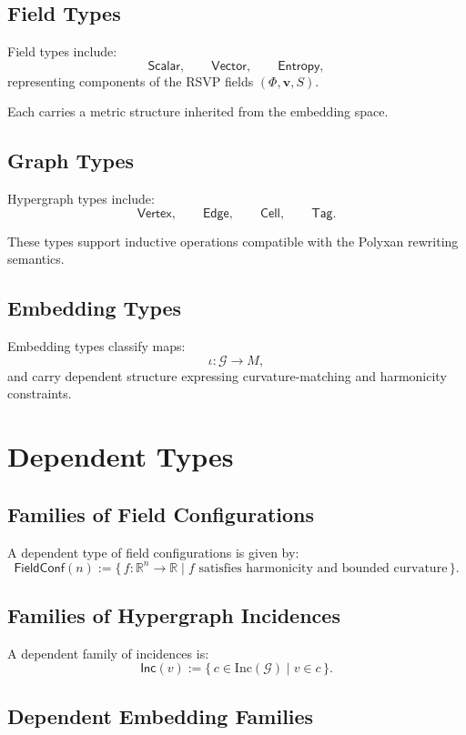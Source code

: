 \subsection{Field Types}

Field types include:
\[
\mathsf{Scalar}, \qquad 
\mathsf{Vector}, \qquad 
\mathsf{Entropy},
\]
representing components of the RSVP fields $(\Phi, \mathbf{v}, S)$.

Each carries a metric structure inherited from the embedding space.

\subsection{Graph Types}

Hypergraph types include:
\[
\mathsf{Vertex}, \qquad 
\mathsf{Edge}, \qquad
\mathsf{Cell}, \qquad
\mathsf{Tag}.
\]

These types support inductive operations compatible with the Polyxan rewriting semantics.

\subsection{Embedding Types}

Embedding types classify maps:
\[
\iota : \mathcal{G} \to M,
\]
and carry dependent structure expressing curvature-matching and harmonicity constraints.

\section{Dependent Types}

\subsection{Families of Field Configurations}

A dependent type of field configurations is given by:
\[
\mathsf{FieldConf}(n) := \{\, f : \mathbb{R}^n \to \mathbb{R} \mid f \text{ satisfies harmonicity and bounded curvature}\,\}.
\]

\subsection{Families of Hypergraph Incidences}

A dependent family of incidences is:
\[
\mathsf{Inc}(v) := \{\, c \in \mathrm{Inc}(\mathcal{G}) \mid v \in c \,\}.
\]

\subsection{Dependent Embedding Families}

